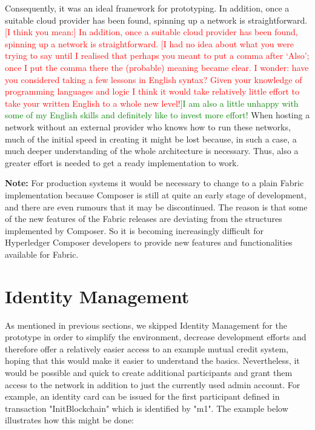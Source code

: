 Consequently, it was an ideal framework for prototyping. In addition, once a suitable cloud provider has been found, spinning up a network is straightforward. \textcolor{red}{[I think you mean:] In addition, once a suitable cloud provider has been found, spinning up a network is straightforward. [I had no idea about what you were trying to say until I realised that perhaps you meant to put a comma after `Also'; once I put the comma there the (probable) meaning became clear. I wonder: have you considered taking a few lessons in English syntax? Given your knowledge of programming languages and logic I think it would take relatively little effort to take your written English to a whole new level!]}\textcolor{green}{I am also a little unhappy with some of my English skills and definitely like to invest more effort!} When hosting a network without an external provider who knows how to run these networks, much of the initial speed in creating it might be lost because, in such a case, a much deeper understanding of the whole architecture is necessary. Thus, also a greater effort is needed to get a ready implementation to work.

\textbf{Note:} For production systems it would be necessary to change to a plain Fabric implementation because Composer is still at quite an early stage of development, and there are even rumours that it may be discontinued. The reason is that some of the new features of the Fabric releases are deviating from the structures implemented by Composer. So it is becoming increasingly difficult for Hyperledger Composer developers to provide new features and functionalities available for Fabric.

\section{Identity Management}
\label{sec:id-management}

As mentioned in previous sections, we skipped Identity Management for the prototype in order to simplify the environment, decrease development efforts and therefore offer a relatively easier access to an example mutual credit system, hoping that this would make it easier to understand the basics. Nevertheless, it would be possible and quick to create additional participants and grant them access to the network in addition to just the currently used admin account. For example, an identity card can be issued for the first participant defined in transaction "InitBlockchain" which is identified by "m1". The example below illustrates how this might be done:

